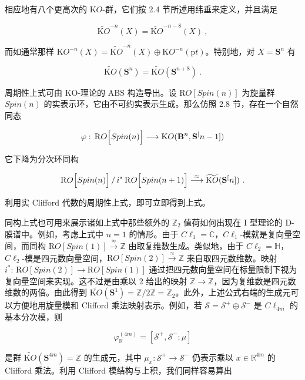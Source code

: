 \documentclass[11pt,a4paper]{ctexart}
\begin{document}
相应地有八个更高次的 \({\mathrm KO}\)-群，它们按 2.4 节所述用纬垂来定义，并且满足

\[\widetilde{{\mathrm KO}}^{-n}(X)=\widetilde{{\mathrm KO}}^{-n-8}(X)\ ,\]

而如通常那样 \({\mathrm KO}^{-n}(X)=\widetilde{{\mathrm KO}}^{-n}(X)\oplus{\mathrm KO}^{-n}({\mathrm pt})\)。特别地，对 \(X={\mathbf S}^n\) 有

\[\widetilde{{\mathrm KO}}({\mathbf S}^n)=\widetilde{{\mathrm KO}}({\mathbf S}^{n+8})\ .\]

周期性上式可由 KO-理论的 ABS 构造导出。设 \({\mathrm RO}[Spin(n)]\) 为旋量群 \(Spin(n)\) 的实表示环，它由不可约实表示生成。那么仿照 2.8 节，存在一个自然同态

\[\varphi: \, {\mathrm RO}\Bigl[Spin(n)\Bigr]\longrightarrow
{\mathrm KO}({\mathbf B}^n, {\mathbf S}^[n-1])\]

它下降为分次环同构

\[{\mathrm RO}\Bigl[Spin(n)\Bigr]\,/\, i^*\,{\mathrm RO}\Bigl[Spin(n+1)\Bigr]
\stackrel{\approx}{\longrightarrow}\widetilde{{\mathrm KO}}({\mathbf S}^[n]) \ .\]

利用实 Clifford 代数的周期性上式，即可立即得到上式。

同构上式也可用来展示诸如上式中那些额外的 \({\mathbb{Z}}_2\) 值荷如何出现在 I 型理论的 D-膜谱中。例如，考虑上式中 \(n=1\) 的情形。由于 \(C\ell_1={\mathbb{C}}\)，\(C\ell_1\)-模就是复向量空间，而同构 \({\mathrm RO}[Spin(1)]\stackrel{\approx}{\rightarrow}{\mathbb{Z}}\) 由取复维数生成。类似地，由于 \(C\ell_2={\mathbb{H}}\)，\(C\ell_2\)-模是四元数向量空间，\({\mathrm RO}[Spin(2)]\stackrel{\approx}{\rightarrow}{\mathbb{Z}}\) 来自取四元数维数。映射 \(i^*:\, {\mathrm RO}[Spin(2)]\rightarrow{\mathrm RO}[Spin(1)]\) 通过把四元数向量空间在标量限制下视为复向量空间来实现。这不过是由乘以 2 给出的映射 \({\mathbb{Z}}\rightarrow{\mathbb{Z}}\)，因为复维数是四元数维数的两倍。由此得到 \(\widetilde{{\mathrm KO}}({\mathbf S}^1)={\mathbb{Z}}/2{\mathbb{Z}}={\mathbb{Z}}_2\)。此外，上述公式右端的生成元可以方便地用旋量模和 Clifford 乘法映射表示。例如，若 \({\mathcal S}={\mathcal S}^+\oplus{\mathcal S}^-\) 是 \(C\ell_{4m}\) 的基本分次模，则

\[\varphi^{(4m)}_{{\mathbb{R}}}=[{\mathcal S}^+,{\mathcal S}^-;\mu]\]

是群 \(\widetilde{{\mathrm KO}}({\mathbf S}^{4m})={\mathbb{Z}}\) 的生成元，其中 \(\mu_x:{\mathcal S}^+\rightarrow {\mathcal S}^-\) 仍表示乘以 \(x\in{\mathbb{R}}^{4m}\) 的 Clifford 乘法。利用 Clifford 模结构与上积，我们同样容易算出
\end{document}
